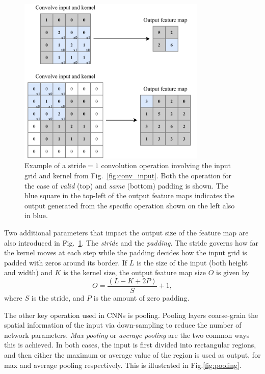\begin{figure} %
    \includegraphics[width=0.8\textwidth]{diagrams/6-cvn/conv_operation.pdf}
    \caption[Example of convolutional operation.]
    {Example of a $\mathrm{stride}=1$ convolution operation involving the input grid and kernel
        from Fig.~\ref{fig:conv_input}. Both the operation for the case of \emph{valid} (top) and
        \emph{same} (bottom) padding is shown. The blue square in the top-left of the output
        feature maps indicates the output generated from the specific operation shown on the left
        also in blue.}
    \label{fig:conv_operation}
\end{figure}

Two additional parameters that impact the output size of the feature map are also introduced in
Fig.~\ref{fig:conv_operation}. The \emph{stride} and the \emph{padding}. The stride governs how
far the kernel moves at each step while the padding decides how the input grid is padded with
zeros around its border. If $L$ is the size of the input (both height and width) and $K$ is the
kernel size, the output feature map size $O$ is given by
\begin{equation}
    O=\frac{(L-K+2P)}{S}+1,
    \label{eq:conv_size}
\end{equation}
where $S$ is the stride, and $P$ is the amount of zero padding.

The other key operation used in CNNs is pooling. Pooling layers coarse-grain the spatial
information of the input via down-sampling to reduce the number of network parameters. \emph{Max
    pooling} or \emph{average pooling} are the two common ways this is achieved. In both cases, the
input is first divided into rectangular regions, and then either the maximum or average value of
the region is used as output, for max and average pooling respectively. This is illustrated in
Fig.\ref{fig:pooling}.

